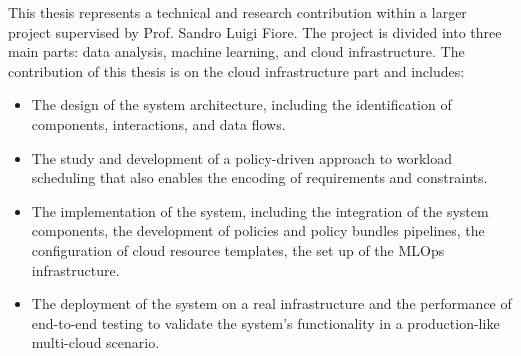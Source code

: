 














This thesis represents a technical and research contribution within a larger project supervised by Prof. Sandro Luigi Fiore. 
The project is divided into three main parts: data analysis, machine learning, and cloud infrastructure.
The contribution of this thesis is on the cloud infrastructure part and includes:
\begin{itemize}
    \item The design of the system architecture, including the identification of components, interactions, and data flows.
    \item The study and development of a policy-driven approach to workload scheduling that also enables the encoding of requirements and constraints.
    \item The implementation of the system, including the integration of the system components, the development of policies and policy bundles pipelines, the configuration of cloud resource templates, the set up of the MLOps infrastructure.
    \item The deployment of the system on a real infrastructure and the performance of end-to-end testing to validate the system's functionality in a production-like multi-cloud scenario.
\end{itemize}

